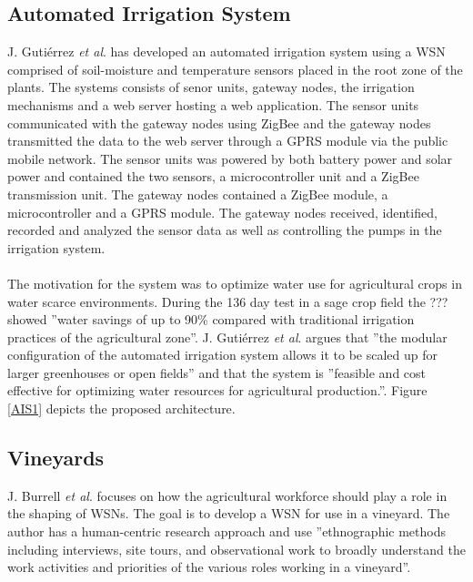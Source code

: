 \documentclass[]{uiophd}
\begin{document}
\subsection{Automated Irrigation System}
J. Gutiérrez \textit{et al}. \cite{6582678} has developed an automated irrigation system using a WSN comprised of soil-moisture and temperature sensors placed in the root zone of the plants. The systems consists of senor units, gateway nodes, the irrigation mechanisms and a web server hosting a web application. The sensor units communicated with the gateway nodes using ZigBee and the gateway nodes transmitted the data to the web server through a GPRS module via the public mobile network. The sensor units was powered by both battery power and solar power and contained the two sensors, a microcontroller unit and a ZigBee transmission unit. The gateway nodes contained a ZigBee module, a microcontroller and a GPRS module. The gateway nodes received, identified, recorded and analyzed the sensor data as well as controlling the pumps in the irrigation system.
\\\\
The motivation for the system was to optimize water use for agricultural crops in water scarce environments. During the 136 day test in a sage crop field the ??? showed ''water savings of up to 90\% compared with traditional irrigation practices of the agricultural zone''\cite{6582678174}. J. Gutiérrez \textit{et al}. argues that ''the modular configuration of the automated irrigation system allows it to be scaled up for larger greenhouses or open fields''\cite{6582678166} and that the system is ''feasible and cost effective for optimizing water resources for agricultural production.''\cite{6582678174}. Figure \ref{AIS1} depicts the proposed architecture.

\subsection{Vineyards}
J. Burrell \textit{et al}.\cite{1269130} focuses on how the agricultural workforce should play a role in the shaping of WSNs. The goal is to develop a WSN for use in a vineyard. The author has a human-centric research approach and use ''ethnographic methods including interviews, site tours, and observational work to broadly understand the work activities and priorities of the various roles working in a vineyard''\cite{126913038}.
\end{document}
